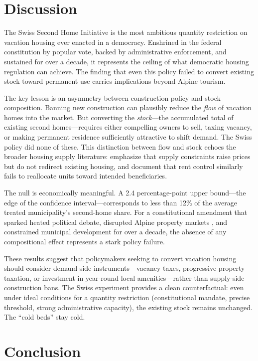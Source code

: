 \documentclass[12pt]{article}
\begin{document}
\section{Discussion}
\label{sec:discussion}

The Swiss Second Home Initiative is the most ambitious quantity restriction on vacation housing ever enacted in a democracy. Enshrined in the federal constitution by popular vote, backed by administrative enforcement, and sustained for over a decade, it represents the ceiling of what democratic housing regulation can achieve. The finding that even this policy failed to convert existing stock toward permanent use carries implications beyond Alpine tourism.

The key lesson is an asymmetry between construction policy and stock composition. Banning new construction can plausibly reduce the \textit{flow} of vacation homes into the market. But converting the \textit{stock}---the accumulated total of existing second homes---requires either compelling owners to sell, taxing vacancy, or making permanent residence sufficiently attractive to shift demand. The Swiss policy did none of these. This distinction between flow and stock echoes the broader housing supply literature: \citet{glaeser2018} emphasize that supply constraints raise prices but do not redirect existing housing, and \citet{diamond2016} document that rent control similarly fails to reallocate units toward intended beneficiaries.

The null is economically meaningful. A 2.4 percentage-point upper bound---the edge of the confidence interval---corresponds to less than 12\% of the average treated municipality's second-home share. For a constitutional amendment that sparked heated political debate, disrupted Alpine property markets \citep{hilber2020}, and constrained municipal development for over a decade, the absence of any compositional effect represents a stark policy failure.

These results suggest that policymakers seeking to convert vacation housing should consider demand-side instruments---vacancy taxes, progressive property taxation, or investment in year-round local amenities---rather than supply-side construction bans. The Swiss experiment provides a clean counterfactual: even under ideal conditions for a quantity restriction (constitutional mandate, precise threshold, strong administrative capacity), the existing stock remains unchanged. The ``cold beds'' stay cold.


\section{Conclusion}
\label{sec:conclusion}
\end{document}
